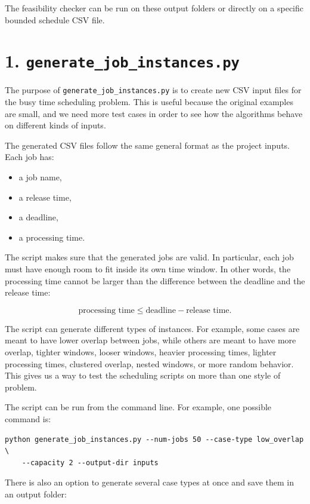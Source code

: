 \documentclass[12pt]{article}
\begin{document}
The feasibility checker can be run on these output folders or directly on a
specific bounded schedule CSV file.

\section*{1. \texttt{generate\_job\_instances.py}}

The purpose of \texttt{generate\_job\_instances.py} is to create new CSV input
files for the busy time scheduling problem. This is useful because the original
examples are small, and we need more test cases in order to see how the
algorithms behave on different kinds of inputs.

The generated CSV files follow the same general format as the project inputs.
Each job has:

\begin{itemize}[leftmargin=*]
    \item a job name,
    \item a release time,
    \item a deadline,
    \item a processing time.
\end{itemize}

The script makes sure that the generated jobs are valid. In particular, each job
must have enough room to fit inside its own time window. In other words, the
processing time cannot be larger than the difference between the deadline and the
release time:

\[
\text{processing time} \leq \text{deadline} - \text{release time}.
\]

The script can generate different types of instances. For example, some cases are
meant to have lower overlap between jobs, while others are meant to have more
overlap, tighter windows, looser windows, heavier processing times, lighter
processing times, clustered overlap, nested windows, or more random behavior.
This gives us a way to test the scheduling scripts on more than one style of
problem.

The script can be run from the command line. For example, one possible command is:

\begin{verbatim}
python generate_job_instances.py --num-jobs 50 --case-type low_overlap \
    --capacity 2 --output-dir inputs
\end{verbatim}

There is also an option to generate several case types at once and save them in
an output folder:
\end{document}
